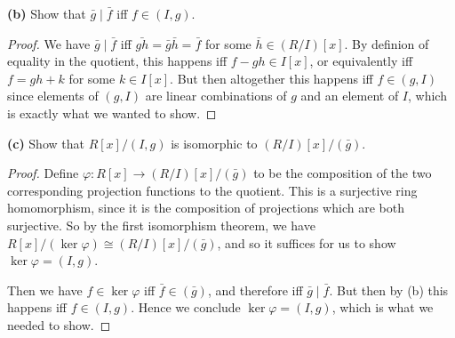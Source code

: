 \documentclass[11pt]{article}
\begin{document}
\textbf{(b)} Show that $\bar g \mid \bar f$ iff $f \in (I,g)$.

\begin{proof}
  We have $\bar g \mid \bar f$ iff $\bar{gh} = \bar g \bar h = \bar f$ for some $\bar h \in (R/I)[x]$.
  By definion of equality in the quotient, this happens iff $f - gh \in I[x]$, or equivalently iff $f = gh + k$ for some $k \in I[x]$.
  But then altogether this happens iff $f \in (g, I)$ since elements of $(g,I)$ are linear combinations of $g$ and an element of $I$, which is exactly what we wanted to show.
\end{proof}

\textbf{(c)} Show that $R[x]/(I,g)$ is isomorphic to $(R/I)[x]/(\bar g)$.

\begin{proof}
  Define $\varphi : R[x] \rightarrow (R/I)[x]/(\bar g)$ to be the composition of the two corresponding projection functions to the quotient.
  This is a surjective ring homomorphism, since it is the composition of projections which are both surjective.
  So by the first isomorphism theorem, we have $R[x]/(\ker \varphi) \cong (R/I)[x]/(\bar g)$, and so it suffices for us to show $\ker \varphi = (I,g)$.

  Then we have $f \in \ker \varphi$ iff $\bar f \in (\bar g)$, and therefore iff $\bar g \mid \bar f$. But then by (b) this happens iff $f \in (I,g)$.
  Hence we conclude $\ker \varphi = (I, g)$, which is what we needed to show.
\end{proof}
\end{document}
